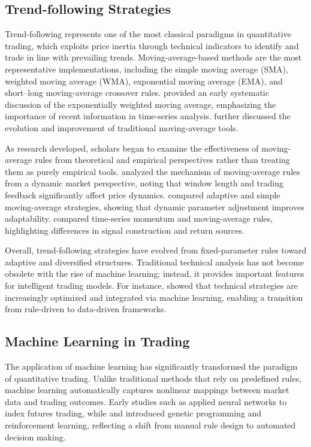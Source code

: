 \documentclass[12pt]{article}
\begin{document}
\subsection{Trend-following Strategies}

Trend-following represents one of the most classical paradigms in quantitative trading, which 
exploits price inertia through technical indicators to identify and trade in line with 
prevailing trends. Moving-average-based methods are the most representative implementations, 
including the simple moving average (SMA), weighted moving average (WMA), exponential moving 
average (EMA), and short--long moving-average crossover rules. \citet{Hunter1986} provided an 
early systematic discussion of the exponentially weighted moving average, emphasizing the 
importance of recent information in time-series analysis. \citet{Hansun2013} further 
discussed the evolution and improvement of traditional moving-average tools.

As research developed, scholars began to examine the effectiveness of moving-average rules 
from theoretical and empirical perspectives rather than treating them as purely empirical 
tools. \citet{ChiarellaHeHommes2006} analyzed the mechanism of moving-average rules from a 
dynamic market perspective, noting that window length and trading feedback significantly 
affect price dynamics. \citet{EllisParbery2005} compared adaptive and simple moving-average 
strategies, showing that dynamic parameter adjustment improves adaptability. 
\citet{MarshallNguyenVisaltanachoti2017} compared time-series momentum and moving-average 
rules, highlighting differences in signal construction and return sources.

Overall, trend-following strategies have evolved from fixed-parameter rules toward adaptive 
and diversified structures. Traditional technical analysis has not become obsolete with the 
rise of machine learning; instead, it provides important features for intelligent trading 
models. For instance, \citet{AyalaEtAl2021} showed that technical strategies are increasingly 
optimized and integrated via machine learning, enabling a transition from rule-driven to 
data-driven frameworks.

\subsection{Machine Learning in Trading}

The application of machine learning has significantly transformed the paradigm of 
quantitative trading. Unlike traditional methods that rely on predefined rules, machine 
learning automatically captures nonlinear mappings between market data and trading outcomes. 
Early studies such as \citet{TrippiDeSieno1992} applied neural networks to index futures 
trading, while \citet{DempsterJones2001} and \citet{DempsterLeemans2006} introduced genetic 
programming and reinforcement learning, reflecting a shift from manual rule design to 
automated decision making.
\end{document}
